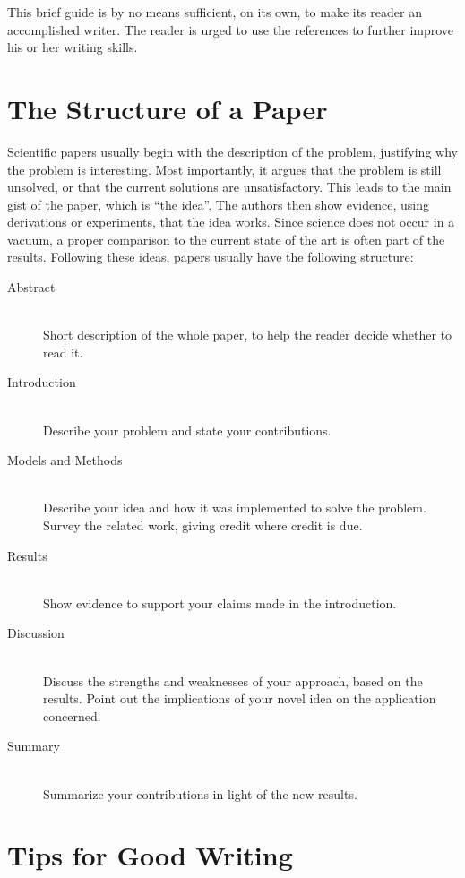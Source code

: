 \documentclass[10pt,conference,compsocconf]{IEEEtran}
\begin{document}
This brief guide is by no means sufficient, on its own, to
make its reader an accomplished writer. The reader is urged to use the
references to further improve his or her writing skills.

\section{The Structure of a Paper}
\label{sec:structure-paper}

Scientific papers usually begin with the description of the problem,
justifying why the problem is interesting. Most importantly, it argues
that the problem is still unsolved, or that the current solutions are
unsatisfactory. This leads to the main gist of the paper, which is
``the idea''. The authors then show evidence, using derivations or
experiments, that the idea works. Since science does not occur in a
vacuum, a proper comparison to the current state of the art is often
part of the results. Following these ideas, papers usually have the
following structure:
\begin{description}
\item[Abstract] \ \\
  Short description of the whole paper, to help the
  reader decide whether to read it.
\item[Introduction] \ \\
  Describe your problem and state your
  contributions.
\item[Models and Methods] \ \\
  Describe your idea and how it was implemented to solve
  the problem. Survey the related work, giving credit where credit is
  due.
\item[Results] \ \\
  Show evidence to support your claims made in the
  introduction.
\item[Discussion] \ \\
  Discuss the strengths and weaknesses of your
  approach, based on the results. Point out the implications of your
  novel idea on the application concerned.
\item[Summary] \ \\
  Summarize your contributions in light of the new
  results.
\end{description}


\section{Tips for Good Writing}
\label{sec:tips-writing}
\end{document}
